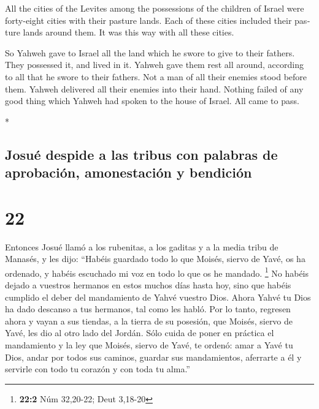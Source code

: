 \begin{paracol}{2}
\begin{otherlanguage}{english}
 All the cities of the Levites among the possessions of
the children of Israel were forty-eight cities with their pasture lands.
 Each of these cities included their pasture lands around
them. It was this way with all these cities.

 So Yahweh gave to Israel all the land which he swore to
give to their fathers. They possessed it, and lived in it.
 Yahweh gave them rest all around, according to all that
he swore to their fathers. Not a man of all their enemies stood before
them. Yahweh delivered all their enemies into their hand.
 Nothing failed of any good thing which Yahweh had spoken
to the house of Israel. All came to pass.

\end{otherlanguage}

\switchcolumn[0]*

\hypertarget{josuuxe9-despide-a-las-tribus-con-palabras-de-aprobaciuxf3n-amonestaciuxf3n-y-bendiciuxf3n}{%
\subsection{Josué despide a las tribus con palabras de aprobación,
amonestación y
bendición}\label{josuuxe9-despide-a-las-tribus-con-palabras-de-aprobaciuxf3n-amonestaciuxf3n-y-bendiciuxf3n}}

\hypertarget{section-42}{%
\section{22}\label{section-42}}

 Entonces Josué llamó a los rubenitas, a los gaditas y a
la media tribu de Manasés,  y les dijo: ``Habéis guardado
todo lo que Moisés, siervo de Yavé, os ha ordenado, y habéis escuchado
mi voz en todo lo que os he mandado. \footnote{\textbf{22:2} Núm
  32,20-22; Deut 3,18-20}  No habéis dejado a vuestros
hermanos en estos muchos días hasta hoy, sino que habéis cumplido el
deber del mandamiento de Yahvé vuestro Dios.  Ahora Yahvé
tu Dios ha dado descanso a tus hermanos, tal como les habló. Por lo
tanto, regresen ahora y vayan a sus tiendas, a la tierra de su posesión,
que Moisés, siervo de Yavé, les dio al otro lado del Jordán.
 Sólo cuida de poner en práctica el mandamiento y la ley
que Moisés, siervo de Yavé, te ordenó: amar a Yavé tu Dios, andar por
todos sus caminos, guardar sus mandamientos, aferrarte a él y servirle
con todo tu corazón y con toda tu alma.''


\end{paracol}
